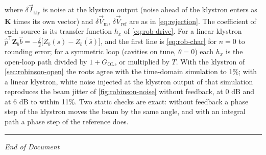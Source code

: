 where \(\delta\vec{I}_\text{kly}\) is noise at the klystron output (noise ahead of the klystron enters as \(\mathbf{K}\) times its own vector) and \(\delta\vec{V}_\text{m}\), \(\delta\vec{V}_\text{ref}\) are as in \cref{eq:rejection}. The coefficient of each source is its transfer function \(h_x\) of \cref{eq:rob-drive}. For a linear klystron \(\hat p^\mathsf{T}\mathbf{Z}_b\hat b = -\tfrac{j}{2}\bigl[Z_b(s) - \overline{Z_b(\bar s)}\bigr]\), and the first line is \cref{eq:rob-char} for \(n = 0\) to rounding error; for a symmetric loop (cavities on tune, \(\theta = 0\)) each \(h_x\) is the open-loop path divided by \(1 + G_\text{OL}\), or multiplied by \(T\). With the klystron of \cref{sec:robinson-open} the roots agree with the time-domain simulation to 1\%; with a linear klystron, white noise injected at the klystron output of that simulation reproduces the beam jitter of \cref{fig:robinson-noise} without feedback, at 0 dB and at 6 dB to within 11\%. Two static checks are exact: without feedback a phase step of the klystron moves the beam by the same angle, and with an integral path a phase step of the reference does.

\begin{center}\rule{0.5\linewidth}{0.5pt}\end{center}

\emph{End of Document}
